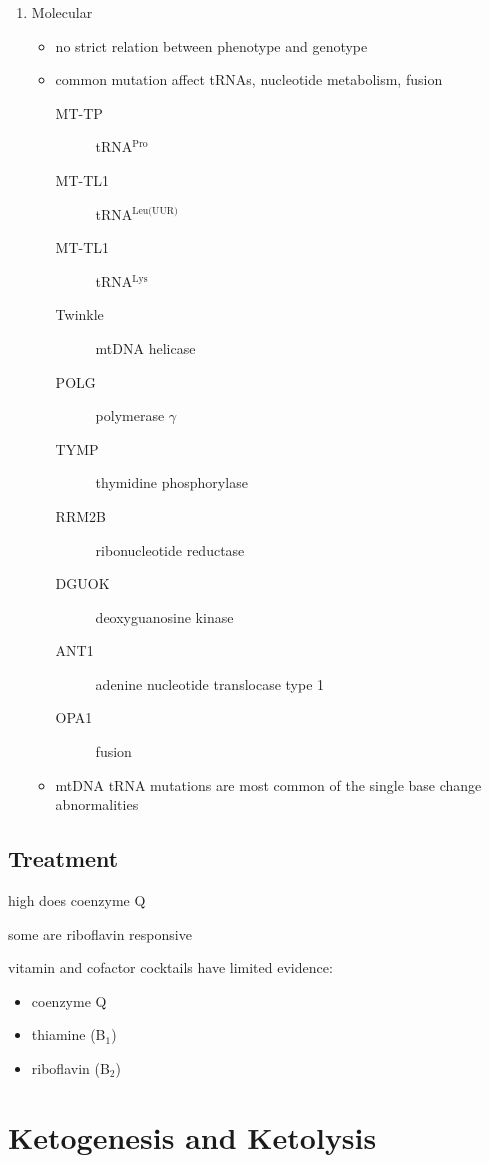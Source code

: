 \documentclass{scrartcl}
\begin{document}
\begin{enumerate}
\item Molecular
\label{sec:org1084df7}
\begin{itemize}
\item no strict relation between phenotype and genotype
\item common mutation affect tRNAs, nucleotide metabolism, fusion
\begin{description}
\item[{MT-TP}] tRNA\(^{\text{Pro}}\)
\item[{MT-TL1}] tRNA\(^{\text{Leu(UUR)}}\)
\item[{MT-TL1}] tRNA\(^{\text{Lys}}\)
\item[{Twinkle}] mtDNA helicase
\item[{POLG}] polymerase \(\gamma\)
\item[{TYMP}] thymidine phosphorylase
\item[{RRM2B}] ribonucleotide reductase
\item[{DGUOK}] deoxyguanosine kinase
\item[{ANT1}] adenine nucleotide translocase type 1
\item[{OPA1}] fusion
\end{description}
\item mtDNA tRNA mutations are most common of the single base change abnormalities
\end{itemize}
\end{enumerate}

\subsection{Treatment}
\label{sec:org88a8716}
\begin{description}
\item[{Coenzyme Q disorders}] high does coenzyme Q
\item[{CI deficiency}] some are riboflavin responsive
\item vitamin and cofactor cocktails have limited evidence:
\begin{itemize}
\item coenzyme Q
\item thiamine (B\(_{\text{1}}\))
\item riboflavin (B\(_{\text{2}}\))
\end{itemize}
\end{description}
\section{Ketogenesis and Ketolysis}
\label{sec:orgfcad3ce}
\end{document}
